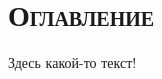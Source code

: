 \documentclass[12pt]{book}
\begin{document}
\chapter{\textsc{Оглавление}}

\thispagestyle{fancy}

\large{Здесь какой-то текст!}
\end{document}
